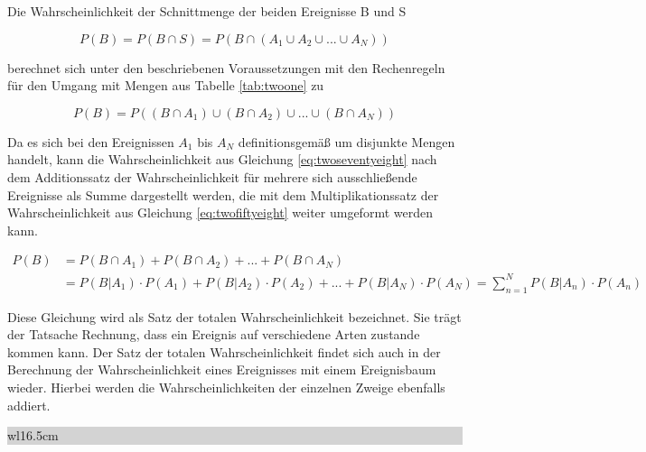 \noindent Die Wahrscheinlichkeit der Schnittmenge der beiden Ereignisse B und S 

\begin{equation}\label{eq:twoseventyseven}
P(B)=P(B\cap S)=P(B\cap (A_{1} \cup A_{2} \cup ...\cup A_{N} ))
\end{equation}

\noindent berechnet sich unter den beschriebenen Voraussetzungen mit den Rechenregeln f\"{u}r den Umgang mit Mengen aus Tabelle \ref{tab:twoone} zu

\begin{equation}\label{eq:twoseventyeight}
P(B)=P((B\cap A_{1} )\cup (B\cap A_{2} )\cup ...\cup (B\cap A_{N} ))
\end{equation}

\noindent Da es sich bei den Ereignissen $A_{1}$ bis $A_{N}$ definitionsgem\"{a}{\ss} um disjunkte Mengen handelt, kann die Wahrscheinlichkeit aus Gleichung \eqref{eq:twoseventyeight} nach dem Additionssatz der Wahrscheinlichkeit f\"{u}r mehrere sich ausschlie{\ss}ende Ereignisse als Summe dargestellt werden, die mit dem Multiplikationssatz der Wahrscheinlichkeit aus Gleichung \eqref{eq:twofiftyeight} weiter umgeformt werden kann.

\begin{equation}\label{eq:twoseventynine}
\begin{split}
P(B) & = P(B\cap A_{1})+P(B\cap A_{2})+...+P(B\cap A_{N}) \\
& = P(B|A_{1})\cdot P(A_{1})+P(B|A_{2})\cdot P(A_{2})+...+P(B|A_{N})\cdot P(A_{N} )=\sum _{n=1}^{N}P(B|A_{n} ) \cdot P(A_{n} )
\end{split}
\end{equation}

\noindent Diese Gleichung wird als Satz der totalen Wahrscheinlichkeit bezeichnet. Sie tr\"{a}gt der Tatsache Rechnung, dass ein Ereignis auf verschiedene Arten zustande kommen kann. Der Satz der totalen Wahrscheinlichkeit findet sich auch in der Berechnung der Wahrscheinlichkeit eines Ereignisses mit einem Ereignisbaum wieder. Hierbei werden die Wahrscheinlichkeiten der einzelnen Zweige ebenfalls addiert. \bigskip

\noindent
\colorbox{lightgray}{%
%
\renewcommand\arraystretch{0.6}%
\begin{tabular}{ wl{16.5cm} }
{\selectfont
{}}
\end{tabular}%
}\bigskip

